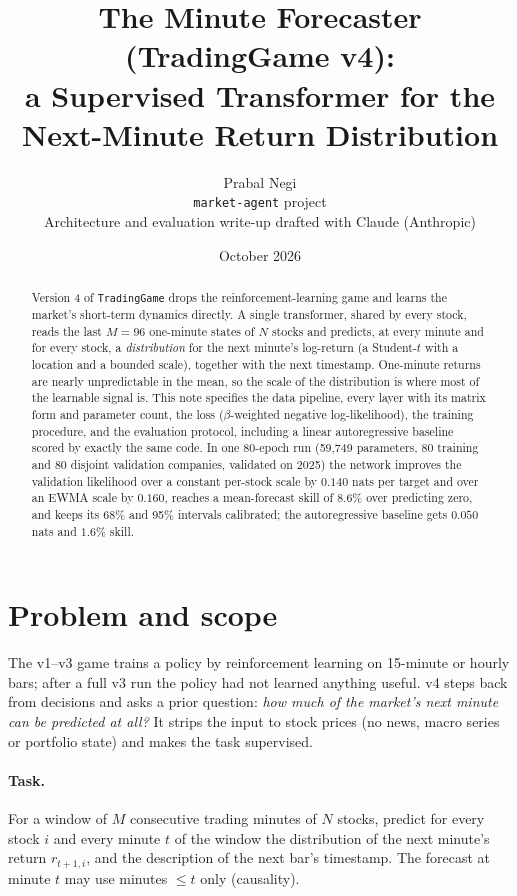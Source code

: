 \documentclass[11pt]{article}
\title{The Minute Forecaster (TradingGame v4):\\
       a Supervised Transformer for the Next-Minute Return Distribution}
\author{Prabal Negi \\ \small \texttt{market-agent} project \\[2pt]
        \small Architecture and evaluation write-up drafted with Claude (Anthropic)}
\date{October 2026}
\begin{document}
\maketitle

\begin{abstract}
\noindent
Version 4 of \texttt{TradingGame} drops the reinforcement-learning game and learns the market's short-term
dynamics directly. A single transformer, shared by every stock, reads the last $M{=}96$ one-minute states of
$N$ stocks and predicts, at every minute and for every stock, a \emph{distribution} for the next minute's
log-return (a Student-$t$ with a location and a bounded scale), together with the next timestamp. One-minute
returns are nearly unpredictable in the mean, so the scale of the distribution is where most of the learnable
signal is. This note specifies the data pipeline, every layer with its matrix form and parameter count, the
loss ($\beta$-weighted negative log-likelihood), the training procedure, and the evaluation protocol, including
a linear autoregressive baseline scored by exactly the same code. In one 80-epoch run (59{,}749 parameters, 80
training and 80 disjoint validation companies, validated on 2025) the network improves the validation likelihood
over a constant per-stock scale by $0.140$ nats per target and over an EWMA scale by $0.160$, reaches a mean-forecast skill
of $8.6\%$ over predicting zero, and keeps its 68\% and 95\% intervals calibrated; the autoregressive baseline gets
$0.050$ nats and $1.6\%$ skill.
\end{abstract}

\tableofcontents

\section{Problem and scope}

The v1--v3 game trains a policy by reinforcement learning on 15-minute or hourly bars; after a full v3
run the policy had not learned anything useful. v4 steps back from decisions and asks a prior question:
\emph{how much of the market's next minute can be predicted at all?} It strips the input to stock prices
(no news, macro series or portfolio state) and makes the task supervised.

\paragraph{Task.} For a window of $M$ consecutive trading minutes of $N$ stocks, predict for every stock $i$ and every
minute $t$ of the window the distribution of the next minute's return $r_{t+1,i}$, and the description of the next
bar's timestamp. The forecast at minute $t$ may use minutes $\le t$ only (causality).
\end{document}
